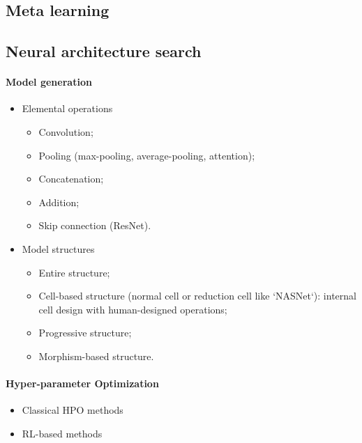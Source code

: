 
\subsection{Meta learning}\label{sec:dttts.survey.meta}

\subsection{Neural architecture search}\label{sec:dttts.survey.nas}

\paragraph{Model generation}

\begin{itemize}
    \item Elemental operations
    \begin{itemize}
        \item Convolution;
        \item Pooling (max-pooling, average-pooling, attention);
        \item Concatenation;
        \item Addition;
        \item Skip connection (ResNet).
    \end{itemize}
    \item Model structures
    \begin{itemize}
        \item Entire structure;
        \item Cell-based structure (normal cell or reduction cell like `NASNet`): internal cell design with human-designed operations;
        \item Progressive structure;
        \item Morphism-based structure.
    \end{itemize}
\end{itemize}

\paragraph{Hyper-parameter Optimization}

\begin{itemize}
    \item Classical HPO methods
    \item RL-based methods
\end{itemize}

